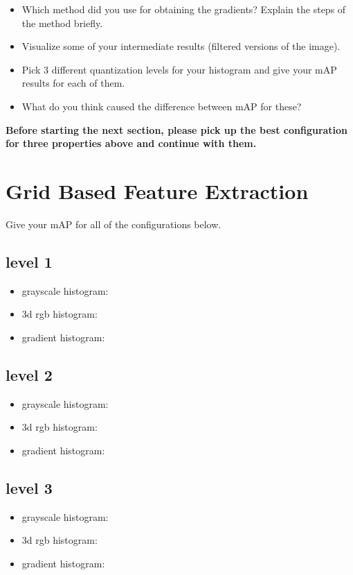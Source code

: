 \documentclass[12pt]{article}
\begin{document}
\begin{itemize}
\item Which method did you use for obtaining the gradients? Explain the steps of the method briefly.
\item Visualize some of your intermediate results (filtered versions of the image).
\item Pick 3 different quantization levels for your histogram and give your mAP results for each of them.
\item What do you think caused the difference between mAP for these?
\end{itemize}

\newpage
\textbf{Before starting the next section, please pick up the best configuration for three properties above and continue with them.}

\section{Grid Based Feature Extraction}
Give your mAP for all of the configurations below.

\subsection{level 1}
\begin{itemize}
\item grayscale histogram:
\item 3d rgb histogram:
\item gradient histogram:
\end{itemize}

\subsection{level 2}
\begin{itemize}
\item grayscale histogram:
\item 3d rgb histogram:
\item gradient histogram:
\end{itemize}

\subsection{level 3}
\begin{itemize}
\item grayscale histogram:
\item 3d rgb histogram:
\item gradient histogram:
\end{itemize}
\end{document}
